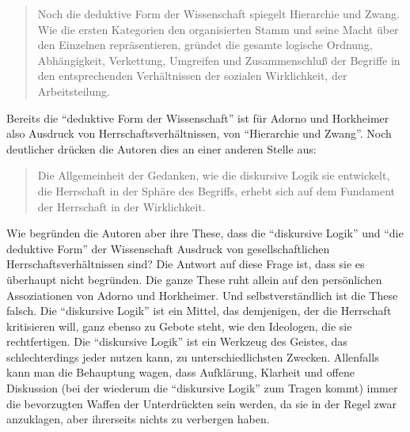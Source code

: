 \documentclass[12pt,a4paper,ngerman]{article}
\begin{document}
\begin{quotation}
Noch die deduktive Form der Wissenschaft spiegelt Hierarchie
und Zwang. Wie die ersten Kategorien den organisierten Stamm und seine Macht
über den Einzelnen repräsentieren, gründet die gesamte logische Ordnung,
Abhängigkeit, Verkettung, Umgreifen und Zusammenschluß der Begriffe in den
entsprechenden Verhältnissen der sozialen Wirklichkeit, der
Arbeitsteilung. \cite[S. 27/28]{adorno-horkheimer:1947} 
\end{quotation}

Bereits die "`deduktive Form der Wissenschaft"' ist für Adorno und
Horkheimer also Ausdruck von Herrschaftsverhältnissen, von
"`Hierarchie und Zwang"'. Noch deutlicher drücken die Autoren dies an
einer anderen Stelle aus: 

\begin{quotation}
Die Allgemeinheit der Gedanken, wie die
diskursive Logik sie entwickelt, die Herrschaft in der Sphäre des
Begriffs, erhebt sich auf dem Fundament der Herrschaft in der
Wirklichkeit. \cite[S. 20]{adorno-horkheimer:1947} 
\end{quotation}

Wie begründen die Autoren aber ihre These, dass die "`diskursive
Logik"' und "`die deduktive Form"' der Wissenschaft Ausdruck von
gesellschaftlichen Herrschaftsverhältnissen sind? Die Antwort auf
diese Frage ist, dass sie es überhaupt nicht begründen. Die ganze
These ruht allein auf den persönlichen Assoziationen von Adorno und
Horkheimer. Und selbstverständlich ist die These falsch. Die
"`diskursive Logik"' ist ein Mittel, das demjenigen, der die
Herrschaft kritisieren will, ganz ebenso zu Gebote steht, wie den
Ideologen, die sie rechtfertigen. Die "`diskursive Logik"' ist ein
Werkzeug des Geistes, das schlechterdings jeder nutzen kann, zu
unterschiedlichsten Zwecken. Allenfalls kann man die Behauptung wagen,
dass Aufklärung, Klarheit und offene Diskussion (bei der wiederum die
"`diskursive Logik"' zum Tragen kommt) immer die bevorzugten Waffen
der Unterdrückten sein werden, da sie in der Regel zwar anzuklagen,
aber ihrerseits nichts zu verbergen haben.
\end{document}
